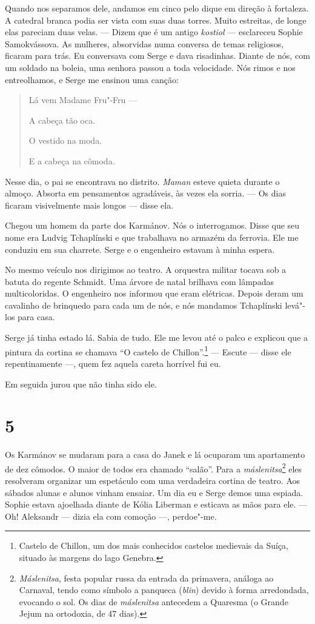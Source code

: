 Quando nos separamos dele, andamos em cinco pelo dique em direção à
fortaleza. A catedral branca podia ser vista com suas duas torres. Muito
estreitas, de longe elas pareciam duas velas. --- Dizem que é um antigo
\emph{kostiol} --- esclareceu Sophie Samokvássova. As mulheres,
absorvidas numa conversa de temas religiosos, ficaram para trás. Eu
conversava com Serge e dava risadinhas. Diante de nós, com um soldado na
boleia, uma senhora passou a toda velocidade. Nós rimos e nos
entreolhamos, e Serge me ensinou uma canção:

\begin{quotation}
Lá vem Madame Fru"-Fru ---

A cabeça tão oca.

O vestido na moda.

E a cabeça na cômoda.
\end{quotation}

Nesse dia, o pai se encontrava no distrito. \emph{Maman} esteve quieta
durante o almoço. Absorta em pensamentos agradáveis, às vezes ela
sorria. --- Os dias ficaram visivelmente mais longos --- disse ela.

Chegou um homem da parte dos Karmánov. Nós o interrogamos. Disse que seu
nome era Ludvig Tchaplínski e que trabalhava no armazém da ferrovia. Ele
me conduziu em sua charrete. Serge e o engenheiro estavam à minha
espera.

No mesmo veículo nos dirigimos ao teatro. A orquestra militar tocava sob
a batuta do regente Schmidt. Uma árvore de natal brilhava com lâmpadas
multicoloridas. O engenheiro nos informou que eram elétricas. Depois
deram um cavalinho de brinquedo para cada um de nós, e nós mandamos
Tchaplínski levá"-los para casa.

Serge já tinha estado lá. Sabia de tudo. Ele me levou até o palco e
explicou que a pintura da cortina se chamava ``O castelo de
Chillon''.\footnote{Castelo de Chillon, um dos mais conhecidos castelos
  medievais da Suíça, situado às margens do lago Genebra.} --- Escute
--- disse ele repentinamente ---, quem fez aquela careta horrível fui
eu.

Em seguida jurou que não tinha sido ele.

\section{5}

Os Karmánov se mudaram para a casa do Janek e lá ocuparam um apartamento
de dez cômodos. O maior de todos era chamado ``salão''. Para a
\emph{máslenitsa}\footnote{\emph{Máslenitsa}, festa popular russa da
  entrada da primavera, análoga ao Carnaval, tendo como símbolo a
  panqueca (\emph{blin}) devido à forma arredondada, evocando o sol. Os
  dias de \emph{máslenitsa} antecedem a Quaresma (o Grande Jejum na
  ortodoxia, de 47 dias).} eles resolveram organizar um espetáculo com
uma verdadeira cortina de teatro. Aos sábados alunas e alunos vinham
ensaiar. Um dia eu e Serge demos uma espiada. Sophie estava ajoelhada
diante de Kólia Liberman e esticava as mãos para ele. --- Oh! Aleksandr
--- dizia ela com comoção ---, perdoe"-me.

